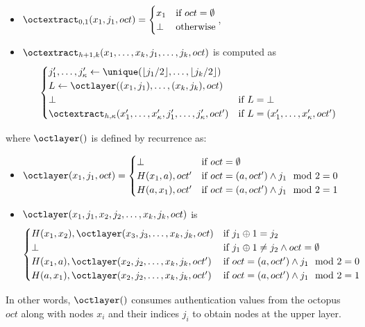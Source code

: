 \begin{itemize}
\item $\octextract_{0,1}(x_1, j_1, oct) = \begin{cases}x_1 & \text{if } oct = \emptyset \\ \bot & \text{otherwise} \end{cases}$,
\item $\octextract_{h+1,k}(x_1, \ldots, x_k, j_1, \ldots, j_k, oct)$ is computed as
%
\[\begin{cases}
j_1', \ldots, j_\kappa' \gets \unique(\lfloor j_1/2 \rfloor, \ldots, \lfloor j_k/2 \rfloor) \\
L \gets \octlayer((x_1, j_1), \ldots, (x_k, j_k), oct) \\
\bot & \text{if } L = \bot \\
\octextract_{h,\kappa}(x'_1, \ldots, x'_\kappa, j_1', \ldots, j_\kappa', oct') & \text{if } L = (x'_1, \ldots, x'_\kappa, oct')
\end{cases}\]
\end{itemize}
%
where $\octlayer()$ is defined by recurrence as:
%
\begin{itemize}
\item $\octlayer(x_1, j_1, oct) = \begin{cases}
        \bot & \text{if } oct = \emptyset \\
        H(x_1, a), oct' & \text{if } oct = (a, oct') \wedge j_1 \mod 2 = 0 \\
        H(a, x_1), oct' & \text{if } oct = (a, oct') \wedge j_1 \mod 2 = 1
    \end{cases}$
\item $\octlayer(x_1, j_1, x_2, j_2, \ldots, x_k, j_k, oct)$ is
%
\[\begin{cases}
    H(x_1, x_2), \octlayer(x_3, j_3, \ldots, x_k, j_k, oct) & \text{if } j_1 \oplus 1 = j_2 \\
    \bot & \text{if } j_1 \oplus 1 \ne j_2 \wedge oct = \emptyset \\
    H(x_1, a), \octlayer(x_2, j_2, \ldots, x_k, j_k, oct') & \text{if } oct = (a, oct') \wedge j_1 \mod 2 = 0 \\
    H(a, x_1), \octlayer(x_2, j_2, \ldots, x_k, j_k, oct') & \text{if } oct = (a, oct') \wedge j_1 \mod 2 = 1
\end{cases}\]
\end{itemize}

In other words, $\octlayer()$ consumes authentication values from the octopus $oct$ along with nodes $x_i$ and their indices $j_i$ to obtain nodes at the upper layer.

